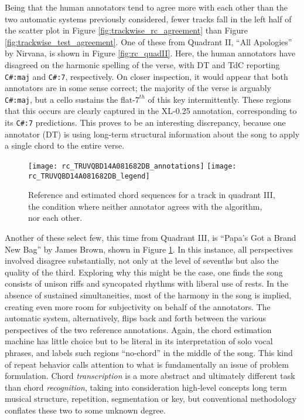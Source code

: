 Being that the human annotators tend to agree more with each other than the two automatic systems previously considered, fewer tracks fall in the left half of the scatter plot in Figure \ref{fig:trackwise_rc_agreement} than Figure \ref{fig:trackwise_test_agreement}.
One of these from Quadrant II, ``All Apologies'' by Nirvana, is shown in Figure \ref{fig:rc_quadII}.
Here, the human annotators have disagreed on the harmonic spelling of the verse, with DT and TdC reporting \texttt{C\#:maj} and \texttt{C\#:7}, respectively.
On closer inspection, it would appear that both annotators are in some sense correct;
the majority of the verse is arguably \texttt{C\#:maj}, but a cello sustains the flat-$7^{th}$ of this key intermittently.
These regions that this occurs are clearly captured in the XL-0.25 annotation, corresponding to its \texttt{C\#:7} predictions.
This proves to be an interesting discrepancy, because one annotator (DT) is using long-term structural information about the song to apply a single chord to the entire verse.

\begin{figure}[t!]
\centering
\texttt{[image: rc\_TRUVQBD14A081682DB\_annotations]}
\texttt{[image: rc\_TRUVQBD14A081682DB\_legend]}
\caption{Reference and estimated chord sequences for a track in quadrant III, the condition where neither annotator agrees with the algorithm, nor each other.}
\label{fig:rc_quadIII}
\end{figure}

Another of these select few, this time from Quadrant III, is ``Papa's Got a Brand New Bag'' by James Brown, shown in Figure \ref{fig:rc_quadIII}.
In this instance, all perspectives involved disagree substantially, not only at the level of sevenths but also the quality of the third.
Exploring why this might be the case, one finds the song consists of unison riffs and syncopated rhythms with liberal use of rests.
In the absence of sustained simultaneities, most of the harmony in the song is implied, creating even more room for subjectivity on behalf of the annotators.
The automatic system, alternatively, flips back and forth between the various perspectives of the two reference annotations.
Again, the chord estimation machine has little choice but to be literal in its interpretation of solo vocal phrases, and labels such regions ``no-chord'' in the middle of the song.
This kind of repeat behavior calls attention to what is fundamentally an issue of problem formulation.
Chord \emph{transcription} is a more abstract and ultimately different task than chord \emph{recognition}, taking into consideration high-level concepts long term musical structure, repetition, segmentation or key, but conventional methodology conflates these two to some unknown degree.


